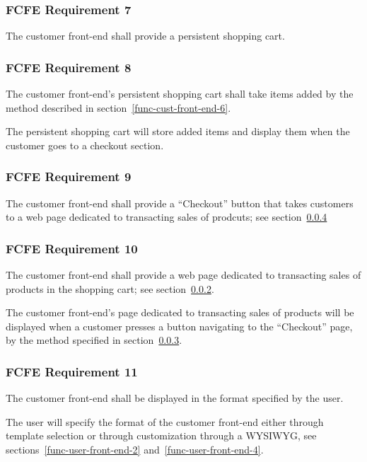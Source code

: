 \documentclass{article}
\begin{document}
\subsubsection{FCFE Requirement 7}
\label{func-cust-front-end-7}

The customer front-end shall provide a persistent shopping cart.

\subsubsection{FCFE Requirement 8}
\label{func-cust-front-end-8}

The customer front-end's persistent shopping cart shall take items added by the
method described in section~\ref{func-cust-front-end-6}.

The persistent shopping cart will store added items and display them when the
customer goes to a checkout section.

\subsubsection{FCFE Requirement 9}
\label{func-cust-front-end-9}

The customer front-end shall provide a ``Checkout'' button that takes customers
to a web page dedicated to transacting sales of prodcuts; see
section~\ref{func-cust-front-end-10}

\subsubsection{FCFE Requirement 10}
\label{func-cust-front-end-10}

The customer front-end shall provide a web page dedicated to transacting sales
of products in the shopping cart; see section~\ref{func-cust-front-end-8}.

The customer front-end's page dedicated to transacting sales of products will be
displayed when a customer presses a button navigating to the ``Checkout'' page,
by the method specified in section~\ref{func-cust-front-end-9}.

\subsubsection{FCFE Requirement 11}
\label{func-cust-front-end-11}

The customer front-end shall be displayed in the format specified by the user.

The user will specify the format of the customer front-end either through
template selection or through customization through a WYSIWYG,
see sections~\ref{func-user-front-end-2} and~\ref{func-user-front-end-4}.
\end{document}
